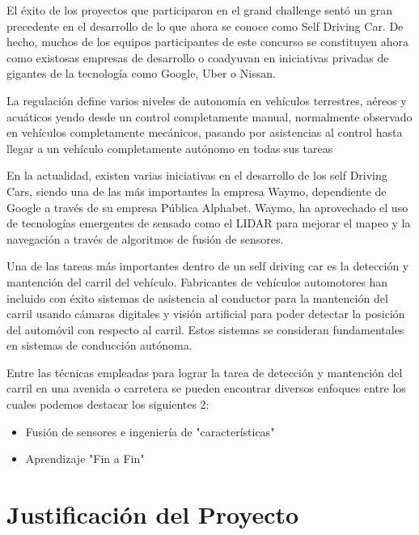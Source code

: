 \documentclass[12pt,letterpaper]{article}
\begin{document}
El éxito de los proyectos que participaron en el grand challenge sentó un gran precedente en el desarrollo de lo que 
ahora se conoce como Self Driving Car. De hecho, muchos de los equipos participantes de este concurso se constituyen 
ahora como existosas empresas de desarrollo o coadyuvan en iniciativas privadas de gigantes de la tecnología 
como Google, Uber o Nissan.

La regulación define varios niveles de autonomía en vehículos terrestres, aéreos y acuáticos yendo desde un control 
completamente manual, normalmente observado en vehículos completamente mecánicos, pasando por asistencias al control 
hasta llegar a un vehículo completamente autónomo en todas sus tareas

En la actualidad, existen varias iniciativas en el desarrollo de los self Driving Cars, siendo una de las más 
importantes la empresa Waymo, dependiente de Google a través de su empresa Pública Alphabet. Waymo, ha aprovechado 
el uso de tecnologías emergentes de sensado como el LIDAR para mejorar el mapeo y la navegación a través de algoritmos 
de fusión de sensores.

Una de las tareas más importantes dentro de un self driving car es la detección y mantención del carril del 
vehículo. Fabricantes de vehículos automotores han incluido con éxito sistemas de asistencia al conductor para la 
mantención del carril usando cámaras digitales y visión artificial para poder detectar la posición del automóvil con 
respecto al carril. Estos sistemas se consideran fundamentales en sistemas de conducción autónoma.

Entre las técnicas empleadas para lograr la tarea de detección y mantención del carril en una avenida o carretera 
se pueden encontrar diversos enfoques entre los cuales podemos destacar los siguientes 2:

\begin{itemize}
    \item Fusión de sensores e ingeniería de "características"
    \item Aprendizaje "Fin a Fin" 
\end{itemize}

\section{Justificación del Proyecto}
\end{document}
